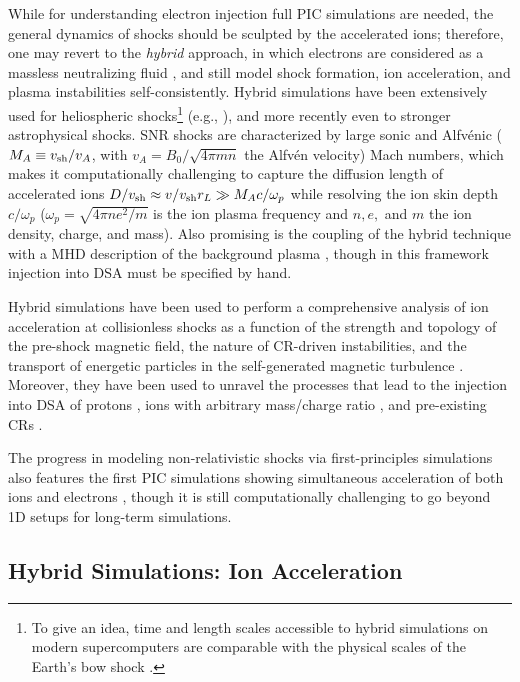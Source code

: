 \documentclass[varenna]{cimento}
\newcommand{\vsh}{v_{\rm sh}}
\begin{document}
While for understanding electron injection full PIC simulations are needed, the general dynamics of shocks should be sculpted by the accelerated ions;
therefore, one may revert to the \emph{hybrid} approach, in which electrons are considered as a massless neutralizing fluid \cite{lipatov02}, and still model shock formation, ion acceleration, and plasma instabilities self-consistently.
Hybrid simulations have been extensively used for heliospheric shocks\footnote{To give an idea, time and length scales accessible to hybrid simulations on modern supercomputers are comparable with the physical scales of the Earth's bow shock \cite{karimabadi+14}.} (e.g., \cite{giacalone+97,burgess+13}), and more recently even to stronger astrophysical shocks.
SNR shocks are characterized by large sonic and Alfv\'enic ($M_A\equiv \vsh/v_A$, with $v_A=B_0/\sqrt{4\pi m n}$ the Alfv\'en velocity) Mach numbers, which makes it computationally challenging to capture the diffusion length of accelerated ions $D/\vsh\approx v/\vsh r_L \gg  M_A c/\omega_p$ while resolving the ion skin depth $c/\omega_p$ ($\omega_p=\sqrt{4\pi n e^2/m}$ is the ion plasma frequency and $n, e,$ and $m$ the ion density, charge, and mass).
Also promising is the coupling of the hybrid technique with a MHD description of the background plasma \cite{bai+15,vanmarle+18}, though in this framework injection into DSA must be specified by hand.

Hybrid simulations have been used to perform a comprehensive analysis of ion acceleration at collisionless shocks as a function of the strength and topology of the pre-shock magnetic field, the nature of CR-driven instabilities, and the transport of energetic particles in the self-generated magnetic turbulence \cite{caprioli+14a,caprioli+14b,caprioli+14c}.  
Moreover, they have been used to unravel the processes that lead to the injection into DSA of protons \cite{caprioli+15}, ions with arbitrary mass/charge ratio \cite{caprioli+17}, and pre-existing CRs \cite{caprioli+18}. 

The progress in modeling non-relativistic shocks via first-principles simulations also features the first PIC simulations showing simultaneous acceleration of both ions and electrons \cite{park+15,kato13,xu+20,crumley+19,shalaby+22}, though it is still computationally challenging to go beyond 1D setups for long-term simulations.


\subsection{\label{sec:hybrid} Hybrid Simulations: Ion Acceleration}
\end{document}
